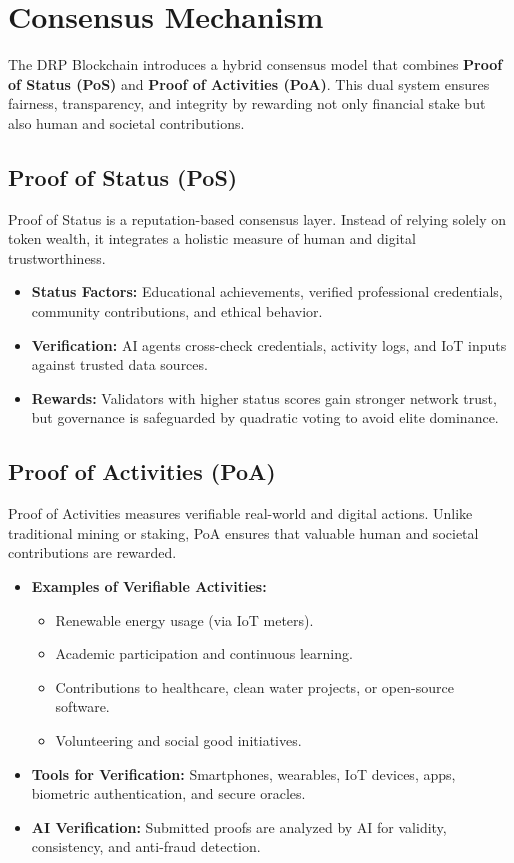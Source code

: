 \documentclass[11pt,a4paper]{article}
\begin{document}
\section{Consensus Mechanism}

The DRP Blockchain introduces a hybrid consensus model that combines \textbf{Proof of Status (PoS\*)} and \textbf{Proof of Activities (PoA\*)}. This dual system ensures fairness, transparency, and integrity by rewarding not only financial stake but also human and societal contributions. 

\subsection{Proof of Status (PoS\*)}
Proof of Status is a reputation-based consensus layer. Instead of relying solely on token wealth, it integrates a holistic measure of human and digital trustworthiness.  
\begin{itemize}
    \item \textbf{Status Factors:} Educational achievements, verified professional credentials, community contributions, and ethical behavior.  
    \item \textbf{Verification:} AI agents cross-check credentials, activity logs, and IoT inputs against trusted data sources.  
    \item \textbf{Rewards:} Validators with higher status scores gain stronger network trust, but governance is safeguarded by quadratic voting to avoid elite dominance.  
\end{itemize}

\subsection{Proof of Activities (PoA\*)}
Proof of Activities measures verifiable real-world and digital actions. Unlike traditional mining or staking, PoA\* ensures that valuable human and societal contributions are rewarded.  
\begin{itemize}
    \item \textbf{Examples of Verifiable Activities:}  
        \begin{itemize}
            \item Renewable energy usage (via IoT meters).  
            \item Academic participation and continuous learning.  
            \item Contributions to healthcare, clean water projects, or open-source software.  
            \item Volunteering and social good initiatives.  
        \end{itemize}
    \item \textbf{Tools for Verification:} Smartphones, wearables, IoT devices, apps, biometric authentication, and secure oracles.  
    \item \textbf{AI Verification:} Submitted proofs are analyzed by AI for validity, consistency, and anti-fraud detection.  
\end{itemize}
\end{document}
